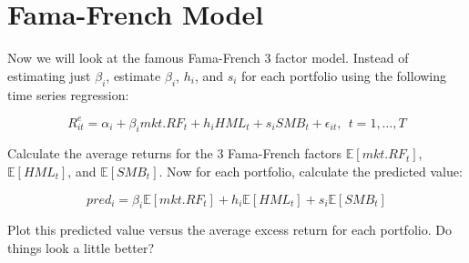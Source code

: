 \documentclass[11pt]{article}
\begin{document}
\section{Fama-French Model}
\label{sec-2}

Now we will look at the famous Fama-French 3 factor model. Instead of
estimating just $\beta_{i}$, estimate $\beta_{i}$, $h_{i}$, and
$s_{i}$ for each portfolio using the following time series regression:

\begin{equation*}
R^{e}_{it} = \alpha_{i} + \beta_{i} mkt.RF_{t} + h_{i} HML_{t} + s_{i} SMB_{t} + \epsilon_{it}, \ \ t=1,\ldots,T
\end{equation*}

Calculate the average returns for the 3 Fama-French factors
$\mathbb{E}[mkt.RF_{t}]$, $\mathbb{E}[HML_{t}]$, and $\mathbb{E}[SMB_{t}]$. Now for each
portfolio, calculate the predicted value:

\begin{equation*}
pred_{i} = \beta_{i} \mathbb{E}[mkt.RF_{t}] + h_{i} \mathbb{E}[HML_{t}] + s_{i} \mathbb{E}[SMB_{t}]
\end{equation*}

Plot this predicted value versus the average excess return for each
portfolio. Do things look a little better?
\end{document}
